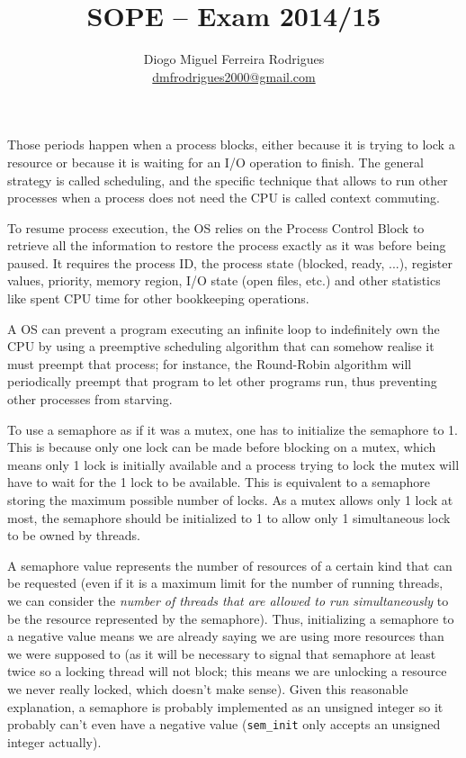 \documentclass{sope}
\title{SOPE -- Exam 2014/15}
\author{Diogo Miguel Ferreira Rodrigues \\ \href{mailto:dmfrodrigues2000@gmail.com}{dmfrodrigues2000@gmail.com}}
\begin{document}
\setcounter{section}{14}
Those periods happen when a process blocks, either because it is trying to lock a resource or because it is waiting for an I/O operation to finish. The general strategy is called scheduling, and the specific technique that allows to run other processes when a process does not need the CPU is called context commuting.

To resume process execution, the OS relies on the Process Control Block to retrieve all the information to restore the process exactly as it was before being paused. It requires the process ID, the process state (blocked, ready, ...), register values, priority, memory region, I/O state (open files, etc.) and other statistics like spent CPU time for other bookkeeping operations.

A OS can prevent a program executing an infinite loop to indefinitely own the CPU by using a preemptive scheduling algorithm that can somehow realise it must preempt that process; for instance, the Round-Robin algorithm will periodically preempt that program to let other programs run, thus preventing other processes from starving.

To use a semaphore as if it was a mutex, one has to initialize the semaphore to 1. This is because only one lock can be made before blocking on a mutex, which means only 1 lock is initially available and a process trying to lock the mutex will have to wait for the 1 lock to be available. This is equivalent to a semaphore storing the maximum possible number of locks. As a mutex allows only 1 lock at most, the semaphore should be initialized to 1 to allow only 1 simultaneous lock to be owned by threads.

A semaphore value represents the number of resources of a certain kind that can be requested (even if it is a maximum limit for the number of running threads, we can consider the \emph{number of threads that are allowed to run simultaneously} to be the resource represented by the semaphore). Thus, initializing a semaphore to a negative value means we are already saying we are using more resources than we were supposed to (as it will be necessary to signal that semaphore at least twice so a locking thread will not block; this means we are unlocking a resource we never really locked, which doesn't make sense). Given this reasonable explanation, a semaphore is probably implemented as an unsigned integer so it probably can't even have a negative value (\texttt{sem\_init} only accepts an unsigned integer actually).
\end{document}
